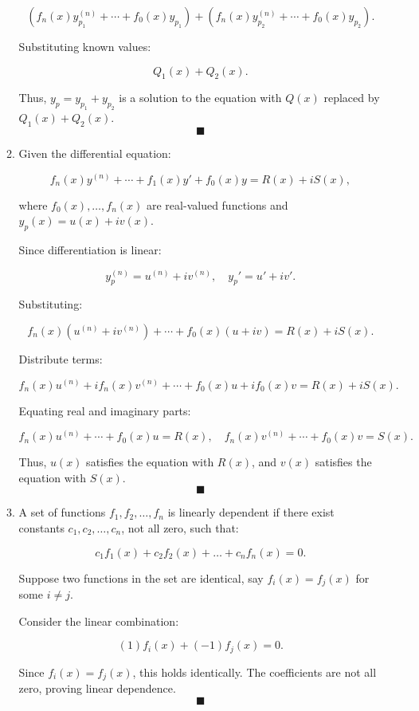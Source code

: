 \documentclass[12pt]{article}
\newcommand{\qed}[0]{$\blacksquare$}
\begin{document}
\begin{enumerate}
\begin{enumerate}
\[
\left( f_n(x)y_{p_1}^{(n)} + \cdots + f_0(x)y_{p_1} \right) + \left( f_n(x)y_{p_2}^{(n)} + \cdots + f_0(x)y_{p_2} \right).
\]

Substituting known values:

\[
Q_1(x) + Q_2(x).
\]

Thus, $y_p = y_{p_1} + y_{p_2}$ is a solution to the equation with $Q(x)$ replaced by $Q_1(x) + Q_2(x)$. $\qed$

\item 

Given the differential equation:

\[
f_n(x)y^{(n)} + \cdots + f_1(x)y' + f_0(x)y = R(x) + iS(x),
\]

where $f_0(x), \dots, f_n(x)$ are real-valued functions and $y_p(x) = u(x) + i v(x)$.

Since differentiation is linear:

\[
y_p^{(n)} = u^{(n)} + i v^{(n)}, \quad y_p' = u' + iv'.
\]

Substituting:

\[
f_n(x)(u^{(n)} + i v^{(n)}) + \cdots + f_0(x)(u + i v) = R(x) + iS(x).
\]

Distribute terms:

\[
f_n(x)u^{(n)} + i f_n(x)v^{(n)} + \cdots + f_0(x)u + i f_0(x)v = R(x) + iS(x).
\]

Equating real and imaginary parts:

\[
f_n(x)u^{(n)} + \cdots + f_0(x)u = R(x), \quad f_n(x)v^{(n)} + \cdots + f_0(x)v = S(x).
\]

Thus, $u(x)$ satisfies the equation with $R(x)$, and $v(x)$ satisfies the equation with $S(x)$. $\qed$

\item 

A set of functions $f_1, f_2, \dots, f_n$ is linearly dependent if there exist constants $c_1, c_2, \dots, c_n$, not all zero, such that:

\[
c_1 f_1(x) + c_2 f_2(x) + \dots + c_n f_n(x) = 0.
\]

Suppose two functions in the set are identical, say $f_i(x) = f_j(x)$ for some $i \neq j$.

Consider the linear combination:

\[
(1) f_i(x) + (-1) f_j(x) = 0.
\]

Since $f_i(x) = f_j(x)$, this holds identically. The coefficients are not all zero, proving linear dependence. $\qed$

\end{enumerate}


\end{enumerate}
\end{document}
